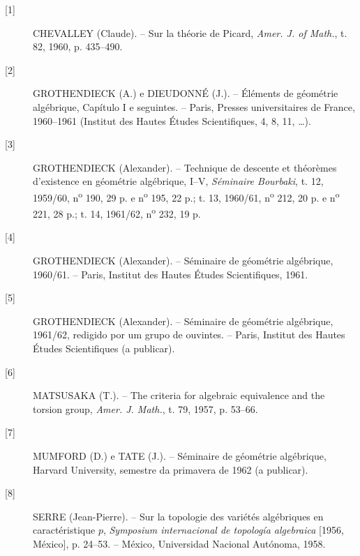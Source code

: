 \begin{description}
\item[{[1]}] CHEVALLEY (Claude). -- Sur la théorie de Picard,
\emph{Amer. J. of Math.}, t. 82, 1960, p. 435--490.

\item[{[2]}] GROTHENDIECK (A.) e DIEUDONNÉ (J.). -- Éléments de géométrie
algébrique, Capítulo I e seguintes. -- Paris, Presses universitaires de France,
1960--1961 (Institut des Hautes Études Scientifiques, 4, 8, 11, \ldots).

\item[{[3]}] GROTHENDIECK (Alexander). -- Technique de descente et théorèmes
d'existence en géométrie algébrique, I--V, \emph{Séminaire Bourbaki}, t. 12,
1959/60, n\textsuperscript{o} 190, 29 p. e n\textsuperscript{o} 195, 22 p.;
t. 13, 1960/61, n\textsuperscript{o} 212, 20 p. e
n\textsuperscript{o} 221, 28 p.; t. 14, 1961/62,
n\textsuperscript{o} 232, 19 p.

\item[{[4]}] GROTHENDIECK (Alexander). -- Séminaire de géométrie algébrique,
1960/61. -- Paris, Institut des Hautes Études Scientifiques, 1961.

\item[{[5]}] GROTHENDIECK (Alexander). -- Séminaire de géométrie algébrique,
1961/62, redigido por um grupo de ouvintes. -- Paris, Institut des Hautes Études
Scientifiques (a publicar).

\item[{[6]}] MATSUSAKA (T.). -- The criteria for algebraic equivalence and the
torsion group, \emph{Amer. J. Math.}, t. 79, 1957, p. 53--66.

\item[{[7]}] MUMFORD (D.) e TATE (J.). -- Séminaire de géométrie algébrique,
Harvard University, semestre da primavera de 1962 (a publicar).

\item[{[8]}] SERRE (Jean-Pierre). -- Sur la topologie des variétés algébriques
en caractéristique $p$, \emph{Symposium internacional de topología algebraica}
[1956, México], p. 24--53. -- México, Universidad Nacional Autónoma, 1958.
\end{description}

\par
